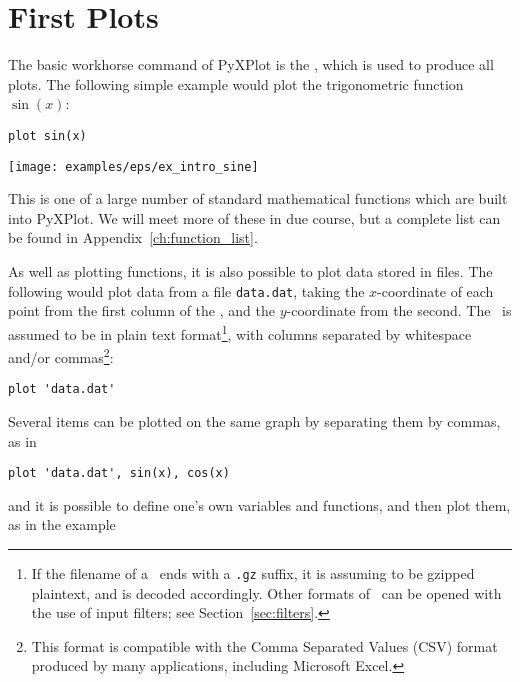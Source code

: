 \section{First Plots}
\label{sec:first_plots}

The basic workhorse command of PyXPlot is the , which is used to
produce all plots. The following simple example would plot the trigonometric
function $\sin(x)$:

\begin{verbatim}
plot sin(x)
\end{verbatim}

\begin{center}
\texttt{[image: examples/eps/ex\_intro\_sine]}
\end{center}

\noindent This is one of a large number of standard mathematical functions
which are built into PyXPlot. We will meet more of these in due course, but a
complete list can be found in Appendix~\ref{ch:function_list}.

As well as plotting functions, it is also possible to plot data stored in
files. The following would plot data from a file {\tt data.dat}, taking the
$x$-coordinate of each point from the first column of the \datafile, and the
$y$-coordinate from the second.  The \datafile\ is assumed to be in plain text
format\footnote{If the filename of a \datafile\ ends with a {\tt .gz} suffix,
it is assuming to be gzipped plaintext, and is decoded accordingly. Other
formats of \datafile\ can be opened with the use of input filters; see
Section~\ref{sec:filters}.}, with columns separated by whitespace and/or
commas\footnote{This format is compatible with the Comma Separated Values (CSV)
format produced by many applications, including Microsoft Excel.}:

\begin{verbatim}
plot 'data.dat'
\end{verbatim}

Several items can be plotted on the same graph by separating them by commas, as
in

\begin{verbatim}
plot 'data.dat', sin(x), cos(x)
\end{verbatim}

\noindent and it is possible to define one's own variables and functions,
and then plot them, as in the example

